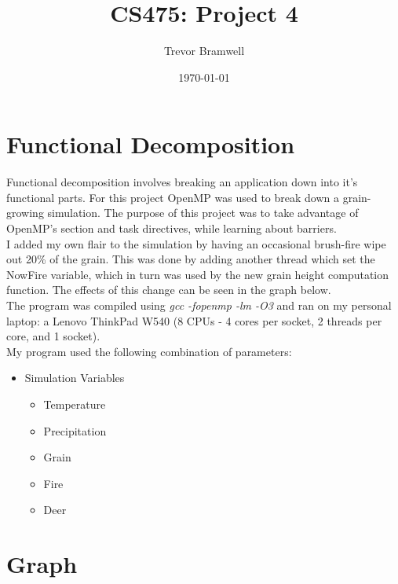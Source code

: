 \documentclass[12pt]{article}
\title{CS475: Project 4}
\author{Trevor Bramwell}
\date{\today}
\begin{document}
\maketitle

\section*{Functional Decomposition}

Functional decomposition involves breaking an application down into it's
functional parts. For this project OpenMP was used to break down a
grain-growing simulation. The purpose of this project was to take
advantage of OpenMP's section and task directives, while learning about
barriers.\\

I added my own flair to the simulation by having an occasional
brush-fire wipe out 20\% of the grain. This was done by adding another
thread which set the NowFire variable, which in turn was used by the
new grain height computation function. The effects of this change can be
seen in the graph below.\\

The program was compiled using \emph{gcc -fopenmp -lm -O3} and ran on my
personal laptop: a Lenovo ThinkPad W540 (8 CPUs - 4 cores per socket, 2
threads per core, and 1 socket).\\

My program used the following combination of parameters:

\begin{itemize}
    \item Simulation Variables
        \begin{multicols}{2}
            \begin{itemize}
                \item Temperature
                \item Precipitation
                \item Grain
                \item Fire
                \item Deer
            \end{itemize}
        \end{multicols}
\end{itemize}


\section*{Graph}
\end{document}
